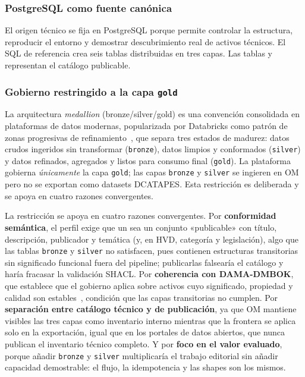 \subsubsection{PostgreSQL como fuente canónica}

El origen técnico se fija en PostgreSQL porque permite controlar la estructura, reproducir el entorno y demostrar descubrimiento real de activos técnicos. El SQL de referencia crea seis tablas distribuidas en tres capas. Las tablas  y  representan el catálogo publicable.

\subsubsection{Gobierno restringido a la capa \texttt{gold}}\label{sec:decision-gold-only}

La arquitectura \emph{medallion} (bronze/silver/gold) es una convención consolidada en plataformas de datos modernas, popularizada por Databricks como patrón de zonas progresivas de refinamiento~\cite{databricksMedallion}, que separa tres estados de madurez: datos crudos ingeridos sin transformar (\texttt{bronze}), datos limpios y conformados (\texttt{silver}) y datos refinados, agregados y listos para consumo final (\texttt{gold}). La plataforma gobierna \emph{únicamente} la capa \texttt{gold}; las capas \texttt{bronze} y \texttt{silver} se ingieren en \ac{OM} pero no se exportan como datasets \ac{DCATAPES}. Esta restricción es deliberada y se apoya en cuatro razones convergentes.

La restricción se apoya en cuatro razones convergentes. Por \textbf{conformidad semántica}, el perfil exige que un  sea un conjunto «publicable» con título, descripción, publicador y temática (y, en HVD, categoría y legislación), algo que las tablas \texttt{bronze} y \texttt{silver} no satisfacen, pues contienen estructuras transitorias sin significado funcional fuera del pipeline; publicarlas falsearía el catálogo y haría fracasar la validación \ac{SHACL}. Por \textbf{coherencia con DAMA-DMBOK}, que establece que el gobierno aplica sobre activos cuyo significado, propiedad y calidad son estables~\cite{damaDmbok}, condición que las capas transitorias no cumplen. Por \textbf{separación entre catálogo técnico y de publicación}, ya que \ac{OM} mantiene visibles las tres capas como inventario interno mientras que la frontera se aplica solo en la exportación, igual que en los portales de datos abiertos, que nunca publican el inventario técnico completo. Y por \textbf{foco en el valor evaluado}, porque añadir \texttt{bronze} y \texttt{silver} multiplicaría el trabajo editorial sin añadir capacidad demostrable: el flujo, la idempotencia y las shapes son los mismos.

